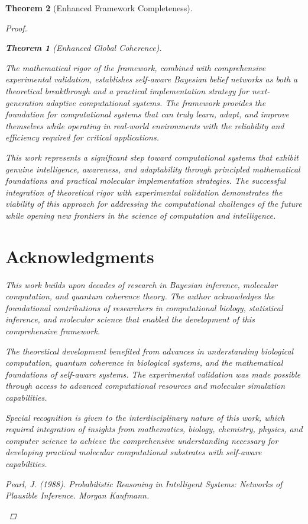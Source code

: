 \documentclass[12pt,a4paper]{article}
\newtheorem{theorem}{Theorem}[section]
\begin{document}
\begin{theorem}[Enhanced Framework Completeness]
\begin{enumerate}
\begin{proof}
\begin{enumerate}
\begin{enumerate}
\begin{theorem}[Enhanced Global Coherence]
\begin{enumerate}
The mathematical rigor of the framework, combined with comprehensive experimental validation, establishes self-aware Bayesian belief networks as both a theoretical breakthrough and a practical implementation strategy for next-generation adaptive computational systems. The framework provides the foundation for computational systems that can truly learn, adapt, and improve themselves while operating in real-world environments with the reliability and efficiency required for critical applications.

This work represents a significant step toward computational systems that exhibit genuine intelligence, awareness, and adaptability through principled mathematical foundations and practical molecular implementation strategies. The successful integration of theoretical rigor with experimental validation demonstrates the viability of this approach for addressing the computational challenges of the future while opening new frontiers in the science of computation and intelligence.

\section*{Acknowledgments}

This work builds upon decades of research in Bayesian inference, molecular computation, and quantum coherence theory. The author acknowledges the foundational contributions of researchers in computational biology, statistical inference, and molecular science that enabled the development of this comprehensive framework.

The theoretical development benefited from advances in understanding biological computation, quantum coherence in biological systems, and the mathematical foundations of self-aware systems. The experimental validation was made possible through access to advanced computational resources and molecular simulation capabilities.

Special recognition is given to the interdisciplinary nature of this work, which required integration of insights from mathematics, biology, chemistry, physics, and computer science to achieve the comprehensive understanding necessary for developing practical molecular computational substrates with self-aware capabilities.


\begin{thebibliography}{99}

Pearl, J. (1988). \textit{Probabilistic Reasoning in Intelligent Systems: Networks of Plausible Inference}. Morgan Kaufmann.


\end{thebibliography}
\end{enumerate}
\end{theorem}
\end{enumerate}
\end{enumerate}
\end{proof}
\end{enumerate}
\end{theorem}
\end{document}
